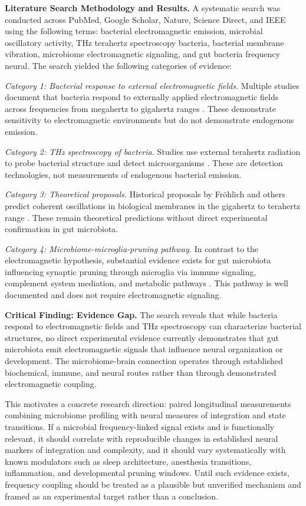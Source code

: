 \documentclass[12pt,letterpaper]{article}
\begin{document}
\textbf{Literature Search Methodology and Results.} A systematic search was conducted across PubMed, Google Scholar, Nature, Science Direct, and IEEE using the following terms: bacterial electromagnetic emission, microbial oscillatory activity, THz terahertz spectroscopy bacteria, bacterial membrane vibration, microbiome electromagnetic signaling, and gut bacteria frequency neural. The search yielded the following categories of evidence:

\textit{Category 1: Bacterial response to external electromagnetic fields.} Multiple studies document that bacteria respond to externally applied electromagnetic fields across frequencies from megahertz to gigahertz ranges \cite{hegazy2025scirep}. These demonstrate sensitivity to electromagnetic environments but do not demonstrate endogenous emission.

\textit{Category 2: THz spectroscopy of bacteria.} Studies use external terahertz radiation to probe bacterial structure and detect microorganisms \cite{luyet2023lowthzmembranes}. These are detection technologies, not measurements of endogenous bacterial emission.

\textit{Category 3: Theoretical proposals.} Historical proposals by Fr\"ohlich and others predict coherent oscillations in biological membranes in the gigahertz to terahertz range \cite{froehlich1968}. These remain theoretical predictions without direct experimental confirmation in gut microbiota.

\textit{Category 4: Microbiome-microglia-pruning pathway.} In contrast to the electromagnetic hypothesis, substantial evidence exists for gut microbiota influencing synaptic pruning through microglia via immune signaling, complement system mediation, and metabolic pathways \cite{eltokhi2020, hao2024, abdelhaq2019}. This pathway is well documented and does not require electromagnetic signaling.

\textbf{Critical Finding: Evidence Gap.} The search reveals that while bacteria respond to electromagnetic fields and THz spectroscopy can characterize bacterial structures, no direct experimental evidence currently demonstrates that gut microbiota emit electromagnetic signals that influence neural organization or development. The microbiome-brain connection operates through established biochemical, immune, and neural routes rather than through demonstrated electromagnetic coupling.

This motivates a concrete research direction: paired longitudinal measurements combining microbiome profiling with neural measures of integration and state transitions. If a microbial frequency-linked signal exists and is functionally relevant, it should correlate with reproducible changes in established neural markers of integration and complexity, and it should vary systematically with known modulators such as sleep architecture, anesthesia transitions, inflammation, and developmental pruning windows. Until such evidence exists, frequency coupling should be treated as a plausible but unverified mechanism and framed as an experimental target rather than a conclusion.
\end{document}
